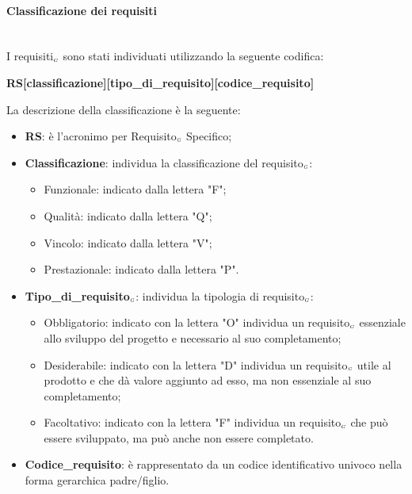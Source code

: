 \paragraph{Classificazione dei requisiti}\label{ProcessiPrimariProspettiveAnalisiDeiRequisitiClassificazioneDeiRequisiti}\mbox{}\\%
I requisiti$_{\scaleto{G}{3pt}}$ sono stati individuati utilizzando la seguente codifica:
\begin{center}
	\textbf{RS[classificazione][tipo\_di\_requisito][codice\_requisito]}
\end{center}
La descrizione della classificazione è la seguente:
\begin{itemize}
	\item \textbf{RS}: è l'acronimo per Requisito$_{\scaleto{G}{3pt}}$ Specifico;
	\item \textbf{Classificazione}: individua la classificazione del requisito$_{\scaleto{G}{3pt}}$:
	\begin{itemize}
		\item Funzionale: indicato dalla lettera "F";
		\item Qualità: indicato dalla lettera "Q";
		\item Vincolo: indicato dalla lettera "V";
		\item Prestazionale: indicato dalla lettera "P".
	\end{itemize}
	\item \textbf{Tipo\_di\_requisito$_{\scaleto{G}{3pt}}$}: individua la tipologia di requisito$_{\scaleto{G}{3pt}}$:
	\begin{itemize}
		\item Obbligatorio: indicato con la lettera "O" individua un requisito$_{\scaleto{G}{3pt}}$ essenziale allo sviluppo del progetto e necessario al suo completamento;
		\item Desiderabile: indicato con la lettera "D" individua un requisito$_{\scaleto{G}{3pt}}$ utile al prodotto e che dà valore aggiunto ad esso, ma non essenziale al suo completamento;
		\item Facoltativo: indicato con la lettera "F" individua un requisito$_{\scaleto{G}{3pt}}$ che può essere sviluppato, ma può anche non essere completato.
	\end{itemize}
	\item \textbf{Codice\_requisito}: è rappresentato da un codice identificativo univoco nella forma gerarchica padre/figlio.
\end{itemize}
